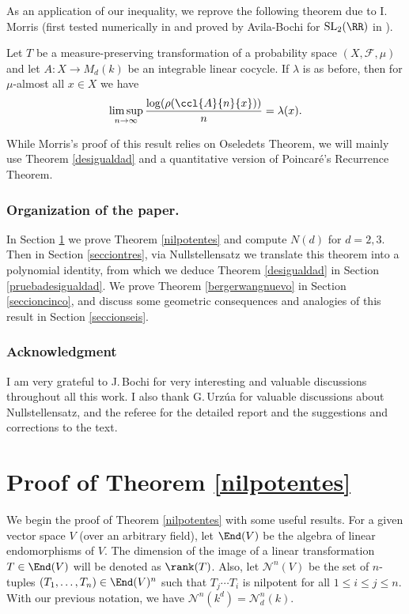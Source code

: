 As an application of our inequality, we reprove the following theorem due to I.\,Morris (first tested numerically in \cite{fisicos} and proved by Avila-Bochi for $\mathrm{SL}_{2}(\RR)$ in \cite[Th.\,15]{avibochi}).

\begin{teo}\label{bergerwangnuevo}\cite[Th.\,1.6]{morrisbw}
Let $T$ be a measure-preserving transformation of a probability space $(X,\mathcal{F},\mu)$ and let $A: X \rightarrow M_{d}(k)$ be an integrable linear cocycle. If $\lambda$ is as before, then for $\mu$-almost all $x\in X$ we have
\begin{equation}\label{bww}
\limsup_{n\to \infty}{\frac{\log(\rho(\ccl{A}{n}{x}))}{n}=\lambda(x)}.
\end{equation}
\end{teo}

While Morris's proof of this result relies on Oseledets Theorem, we will mainly use Theorem \ref{desigualdad} and a quantitative version of Poincaré's Recurrence Theorem.

\subsubsection*{Organization of the paper.} In Section \ref{secciondos} we prove Theorem \ref{nilpotentes} and compute $N(d)$ for $d=2,3$. Then in Section \ref{secciontres}, via Nullstellensatz we translate this theorem into a polynomial identity, from which we deduce Theorem \ref{desigualdad} in Section \ref{pruebadesigualdad}. We prove Theorem \ref{bergerwangnuevo} in Section \ref{seccioncinco}, and discuss some geometric consequences and analogies of this result in Section \ref{seccionseis}.

\subsubsection*{Acknowledgment}
I am very grateful to J.\,Bochi for very interesting and valuable discussions throughout all this work. I also thank G.\,Urzúa for valuable discussions about Nullstellensatz, and the referee for the detailed report and the suggestions and corrections to the text.

\section{Proof of Theorem \ref{nilpotentes}}\label{secciondos}

We begin the proof of Theorem \ref{nilpotentes} with some useful results. For a given vector space $V$ (over an arbitrary field), let $\End(V)$ be the algebra of linear endomorphisms of $V$. The dimension of the image of a linear transformation $T\in \End(V)$ will be denoted as $\rank(T)$. Also, let $\mathcal{N}^{n}(V)$ be the set of $n$-tuples $(T_1,\dots,T_n)\in \End(V)^{n}$ such that $T_{j}\cdots T_{i}$ is nilpotent for all $1\leq i \leq j \leq n$. With our previous notation, we have $\mathcal{N}^{n}(k^{d})=\mathcal{N}^{n}_{d}(k)$.

